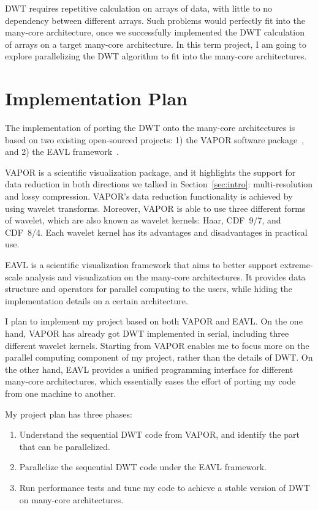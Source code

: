 \documentclass{article}
\begin{document}
DWT requires repetitive calculation on arrays of data, with little to no
dependency between different arrays.
%
Such problems would perfectly fit into the many-core architecture, once we
successfully implemented the DWT calculation of arrays on a target many-core
architecture.
%
In this term project, I am going to explore parallelizing the DWT algorithm 
to fit into the many-core architectures.


\section{Implementation Plan}
The implementation of porting the DWT onto the many-core architectures
is based on two existing open-sourced projects: 1) the VAPOR software 
package~\cite{clyne2007interactive},
and 2) the EAVL framework~\cite{meredith2012distributed}.

VAPOR is a scientific visualization package, and it highlights the 
support for data reduction in both directions we talked in
Section~\ref{sec:intro}: multi-resolution and lossy compression.
%
VAPOR's data reduction functionality is achieved by using wavelet transforms.
%
Moreover, VAPOR is able to use three different forms of wavelet, which 
are also known as wavelet kernels: Haar, CDF~9/7, and CDF~8/4.  
%
Each wavelet kernel has its advantages and disadvantages in practical use.

EAVL is a scientific visualization framework that aims to better support
extreme-scale analysis and visualization on the many-core architectures.
%
It provides data structure and operators for parallel computing to the 
users, while hiding the implementation details on a certain architecture.

I plan to implement my project based on both VAPOR and EAVL. 
%
On the one hand, VAPOR has already got DWT implemented in serial, 
including three different wavelet kernels.
%
Starting from VAPOR enables me to focus more on the parallel computing 
component of my project, rather than the details of DWT.
%
On the other hand, EAVL provides a unified programming interface for 
different many-core architectures, which essentially eases the effort
of porting my code from one machine to another.

My project plan has three phases:
\begin{enumerate}
\item Understand the sequential DWT code from VAPOR, 
and identify the part that can be parallelized.
%
\item Parallelize the sequential DWT code under the EAVL framework.
%
\item Run performance tests and tune my code to achieve a stable version
of DWT on many-core architectures.
\end{enumerate}
\end{document}

